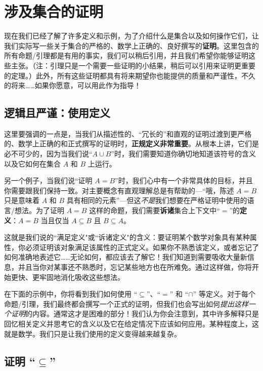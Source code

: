 \section{涉及集合的证明}

现在我们已经了解了许多定义和示例，为了介绍什么是集合以及如何操作它们，让我们实际写一些关于集合的严格的、数学上正确的、良好撰写的\textbf{证明}。这里包含的所有命题/引理都是有用的事实，我们可以稍后引用，并且我们希望你能够证明这些主张。（注：引理只是一个需要一些证明的小结果，稍后可以引用来证明更重要的定理。）此外，所有这些证明都具有将来期望你也能提供的质量和严谨性，不久的将来……如果你愿意，可以用此作为指导！

\subsection{逻辑且严谨：使用定义}

这里要强调的一点是，当我们从描述性的、``冗长的''和直观的证明过渡到更严格的、数学上正确的和正式撰写的证明时，\textbf{正规定义非常重要}。从根本上讲，它们是必不可少的，因为当我们说``$A \cup B$''时，我们需要知道你确切地知道该符号的含义以及它如何在集合 $A$ 和 $B$ 上运行。

另一个例子，当我们说``证明 $A = B$''时，我们心中有一个非常具体的目标，并且你需要跟我们保持一致。对主要概念有直观理解总是有帮助的---``哦，陈述 $A = B$ 只是意味着 $A$ 和 $B$ 具有相同的元素''---但这\emph{不是}我们想要在严格证明中使用的语言/想法。为了证明 $A = B$ 这样的命题，我们需要\textbf{诉诸}集合上下文中``$=$''的\textbf{定义}：$A = B$ 当且仅当 $A \subseteq B$ 且 $B \subseteq A$。

这就是我们说的``满足定义"或``诉诸定义"的含义：要证明某个数学对象具有某种属性，你必须证明该对象满足该属性的正式定义。如果你不熟悉该定义，或者忘记了如何准确地表述它……无论如何，都应该去了解它！我们知道到需要吸收大量新信息，并且当你对某事还不熟悉时，忘记某些地方也在所难免。通过这样做，你将开始更快、更牢固地消化吸收这些想法。

在下面的示例中，你将看到我们如何使用 ``$\subseteq$''、``$=$'' 和 ``$\cap$'' 等定义。对于每个命题/引理，我们最终都会撰写一个正式的证明，但我们也会写出如何\emph{提出这样一个证明}的内容。通常这才是困难的部分！我们认为你会注意到，其中许多解释只是回忆相关定义并思考它的含义以及它在给定情况下应该如何应用。某种程度上，这就是数学。我们只是让我们使用的定义变得越来越复杂。

\subsection{证明 ``$\subseteq$''}

